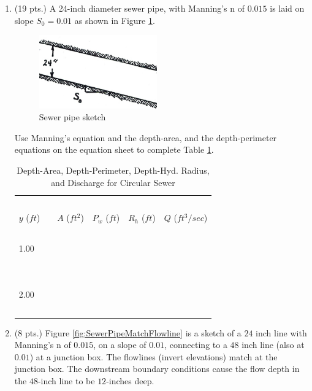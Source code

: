 \documentclass[11pt]{article}
\begin{document}
\begin{enumerate}
\clearpage
\item (19 pts.)
A 24-inch diameter sewer pipe, with Manning's n of $0.015$ is laid on slope $S_0 =0.01$ as shown in Figure \ref{fig:PipeOnSlope}.    

\begin{figure}[h!] %
\centering
   \includegraphics[width=2in]{PipeOnSlope.jpg}
   \caption{Sewer pipe sketch}
   \label{fig:PipeOnSlope} 
\end{figure}

Use Manning's equation and the depth-area, and the depth-perimeter equations on the equation sheet to complete Table \ref{tab:SewerPipes}.
\begin{table}[htbp]
   \centering
   \caption{Depth-Area, Depth-Perimeter, Depth-Hyd. Radius, and Discharge for Circular Sewer}
   \begin{tabular}{p{1in}p{1in}p{1in}p{1in}p{1in}}
   ~ & ~ & ~  & ~ & ~ \\
$y$ ($ft$)~~& $A$ ($ft^2$) & $P_w$ ($ft$) & $R_h$ ($ft$) & $Q$ ($ft^3/sec$) \\
\hline
\hline
~ & ~ & ~  & ~ & ~ \\
1.00 & ~ & ~  & ~ & ~ \\
~& ~ & ~  & ~ & ~ \\
\hline
~ & ~ & ~  & ~ & ~ \\
2.00 & ~ & ~  & ~ & ~ \\
~ & ~ & ~  & ~ & ~ \\
\hline
   \end{tabular}
   \label{tab:SewerPipes}
\end{table}

\clearpage
\item (8 pts.) 
Figure \ref{fig:SewerPipeMatchFlowline} is a sketch of a $24$ inch line with Manning's n of $0.015$, on a slope of $0.01$, connecting to a $48$ inch line (also at $0.01$) at a junction box.   The flowlines (invert elevations) match at the junction box.  The downstream boundary conditions cause the flow depth in the $48$-inch line to be $12$-inches deep.


\end{enumerate}
\end{document}
